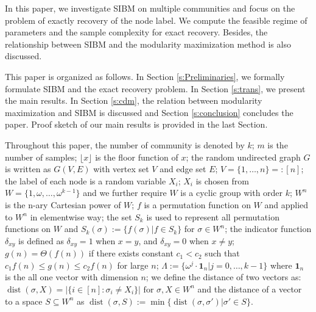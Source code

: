 \documentclass[conference]{IEEEtran}
\newcommand{\ide}[2]{ \delta_{#1 #2} }
\DeclareMathOperator{\dist}{dist}
\begin{document}
	In this paper, we  investigate SIBM on multiple communities and focus on the problem of exactly recovery of the node label.
	We  compute the feasible regime of parameters and the sample complexity for exact recovery. Besides, the relationship between SIBM and the modularity maximization method
	is also discussed. 
	
	This paper is organized as follows. In Section \ref{s:Preliminaries}, we formally formulate SIBM and the exact recovery problem.
	In Section \ref{s:trans}, we present the main results.
	In Section \ref{s:cdm}, the relation between modularity maximization and SIBM is discussed 
	and Section \ref{s:conclusion} concludes the paper.
	Proof sketch of our main results is provided in the last Section.
	
	Throughout this paper, the number of community is denoted by $k$; $m$ is the number of samples; $\lfloor x \rfloor$ is the floor function of $x$; the random undirected graph $G$ is written as $G(V,E)$ with vertex set $V$ and edge set $E$;
	$V=\{1,\dots, n\} =: [n]$;
	the label of each node is a random variable $X_i$; $X_i$ is chosen from $W= \{1, \omega, \dots, \omega^{k-1}\}$ and we further require $W$
	is a cyclic group with order $k$; $W^n$ is the n-ary Cartesian power of $W$; $f$ is a permutation function on $W$ and applied to $W^n$ in elementwise way; the set $S_k$ is used to represent all permutation functions on $W$ and $S_k(\sigma):=\{f(\sigma)| f\in S_k\}$ for $\sigma \in W^n$; the indicator function $\ide{x}{y}$ is defined as
	$\ide{x}{y} = 1 $ when $x=y$, and $\ide{x}{y}=0$ when $x\neq y$; $g(n) = \Theta(f(n))$ if there exists constant $c_1 < c_2$ such that $c_1 f(n) \leq g(n) \leq c_2 f(n)$
	for large $n$;
	$\Lambda := \{ \omega^j  \cdot \mathbf{1}_n | j=0, \dots,k-1\}$
	where $\mathbf{1}_n$ is the all one vector with dimension $n$;
	we define the distance of two vectors as:
	$\dist(\sigma, X)
	=|\{i\in[n]:\sigma_i\neq X_i\}| \textrm{ for } \sigma,X\in W^n
	$ and the distance of a vector to a space $S\subseteq W^n$
	as
	$\dist(\sigma,S)
	:=\min\{\dist(\sigma, \sigma') | \sigma' \in S\}
	$.
	
\end{document}

